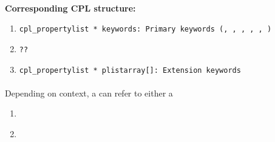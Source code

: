 \paragraph{\hyperref[dataitem:n_distortion_table]{}}\label{drsstructure:N_DISTORTION_TABLE}
\begin{datastructdef}
\textbf{Corresponding \ac{CPL} structure:}
\begin{enumerate}
    \item \texttt{cpl\_propertylist * keywords: Primary keywords (\hyperref[fits:dpr.catg]{},  \hyperref[fits:dpr.tech]{},  \hyperref[fits:dpr.type]{},  \hyperref[fits:ins.opti3.name]{},  \hyperref[fits:ins.opti9.name]{},  \hyperref[fits:ins.opti10.name]{})}
    \item \texttt{??}
    \item \texttt{cpl\_propertylist * plistarray[]: Extension keywords}
\end{enumerate}
\end{datastructdef}


\paragraph{\hyperref[dataitem:det_distortion_map]{}}\label{dataitem:det_distortion_map}
Depending on context, a \hyperref[dataitem:det_distortion_map]{} can refer to either a
\begin{enumerate}
\item \hyperref[dataitem:n_distortion_map]{}
\item \hyperref[dataitem:lm_distortion_map]{}
\end{enumerate}


